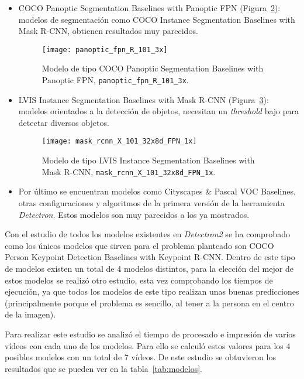 {\begin{itemize}
	\begin{figure}[h]
		\centering
		\texttt{[image: keypoint\_rcnn\_R\_101\_FPN\_3x]}
		\caption{Modelo de tipo COCO Person Keypoint Detection Baselines with Keypoint R-CNN, \texttt{keypoint\_rcnn\_R\_101\_FPN\_3x}.}
		\label{fig:keypoint_rcnn_R_101_FPN_3x}
	\end{figure}
	\item COCO Panoptic Segmentation Baselines with Panoptic FPN (Figura~\ref{fig:panoptic_fpn_R_101_3x}): modelos de segmentación como COCO Instance Segmentation Baselines with Mask R-CNN, obtienen resultados muy parecidos.
	\begin{figure}[h]
		\centering
		\texttt{[image: panoptic\_fpn\_R\_101\_3x]}
		\caption{Modelo de tipo COCO Panoptic Segmentation Baselines with Panoptic FPN, \texttt{panoptic\_fpn\_R\_101\_3x}.}
		\label{fig:panoptic_fpn_R_101_3x}
	\end{figure}
	\item LVIS Instance Segmentation Baselines with Mask R-CNN (Figura~\ref{fig:mask_rcnn_X_101_32x8d_FPN_1x}): modelos orientados a la detección de objetos, necesitan un \textit{threshold} bajo para detectar diversos objetos.
	\begin{figure}[h]
		\centering
		\texttt{[image: mask\_rcnn\_X\_101\_32x8d\_FPN\_1x]}
		\caption{Modelo de tipo LVIS Instance Segmentation Baselines with Mask R-CNN, \texttt{mask\_rcnn\_X\_101\_32x8d\_FPN\_1x}.}
		\label{fig:mask_rcnn_X_101_32x8d_FPN_1x}
	\end{figure}
	\item Por último se encuentran modelos como Cityscapes \& Pascal VOC Baselines, otras configuraciones y algoritmos de la primera versión de la herramienta \textit{Detectron}. Estos modelos son muy parecidos a los ya mostrados.
\end{itemize}

Con el estudio de todos los modelos existentes en \textit{Detectron2} se ha comprobado como los únicos modelos que sirven para el problema planteado son COCO Person Keypoint Detection Baselines with Keypoint R-CNN. Dentro de este tipo de modelos existen un total de 4 modelos distintos, para la elección del mejor de estos modelos se realizó otro estudio, esta vez comprobando los tiempos de ejecución, ya que todos los modelos de este tipo realizan unas buenas predicciones (principalmente porque el problema es sencillo, al tener a la persona en el centro de la imagen).

Para realizar este estudio se analizó el tiempo de procesado e impresión de varios vídeos con cada uno de los modelos. Para ello se calculó estos valores para los 4 posibles modelos con un total de 7 vídeos. De este estudio se obtuvieron los resultados que se pueden ver en la tabla~\ref{tab:modelos}.

}
